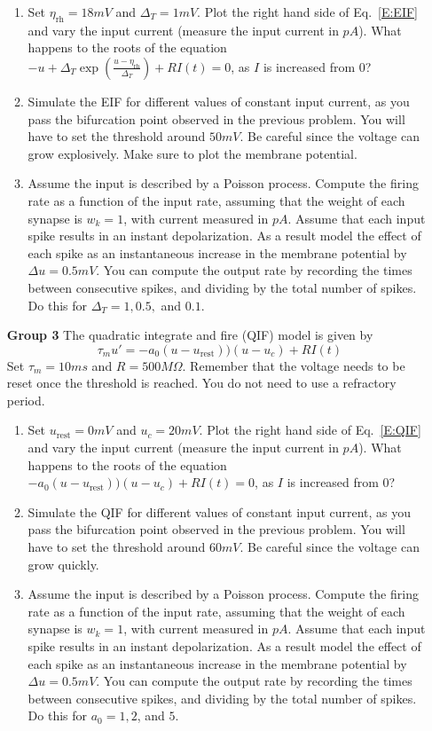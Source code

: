 \documentclass[12pt]{article}
\begin{document}
\begin{enumerate}
\begin{enumerate}
\item Set $\eta_{\text{rh}} = 18 mV$ and $\Delta_T = 1 mV$. Plot the right hand side of Eq.~\eqref{E:EIF} and vary the input current (measure the input
current in $pA$).  What happens to the roots of the equation $- u + \Delta_T \exp \left( \frac{u - \eta_{\text{rh}}}{\Delta_T} \right) + R I(t) = 0$,
as $I$ is increased from 0? 
\item Simulate the EIF for different values of constant input current, as you pass the bifurcation point observed in the previous problem. 
You will have to set the threshold around $50mV$.  Be careful since the voltage can grow explosively.  Make sure to plot the membrane potential.
\item Assume the input is described by a Poisson process. Compute the firing rate as a function of the input rate, assuming that the weight of each synapse is $w_k = 1$,
with current measured in $pA$.  Assume that each input spike results in an instant depolarization.  As a result model the effect of each spike as  an instantaneous increase in the membrane potential
by $\Delta u = 0.5mV$.  You can compute the output rate by recording the times between consecutive spikes, and dividing by the total
number of spikes. Do this for $\Delta_T = 1, 0.5,$ and $0.1$.
\end{enumerate}

\item[\bf Group 3] 
The quadratic integrate and fire (QIF) model is given by 
\begin{equation} \label{E:QIF}
\tau_m u' = - a_0 (u - u_{\text{rest}}))(u - u_c) + R I(t) 
\end{equation}
Set $\tau_m = 10 ms$ and $R = 500M \Omega$. Remember that the voltage needs to be reset once the threshold is reached.  You do not need to use a refractory period.   

\begin{enumerate}
\item Set $u_{\text{rest}}  = 0 mV$ and $u_c = 20mV$. Plot the right hand side of Eq.~\eqref{E:QIF} and vary the input current (measure the input
current in $pA$).  What happens to the roots of the equation $- a_0 (u - u_{\text{rest}}))(u - u_c) + R I(t)  = 0$,
as $I$ is increased from 0? 
\item Simulate the QIF for different values of constant input current, as you pass the bifurcation point observed in the previous problem. 
You will have to set the threshold around $60mV$.  Be careful since the voltage can grow quickly.
\item Assume the input is described by a Poisson process. Compute the firing rate as a function of the input rate, assuming that the weight of each synapse is $w_k = 1$,
with current measured in $pA$.  Assume that each input spike results in an instant depolarization.  As a result model the effect of each spike as  an instantaneous increase in the membrane potential
by $\Delta u = 0.5mV$.  You can compute the output rate by recording the times between consecutive spikes, and dividing by the total
number of spikes.  Do this for $a_0 = 1, 2$, and $5$.
\end{enumerate}


\end{enumerate}
\end{document}
